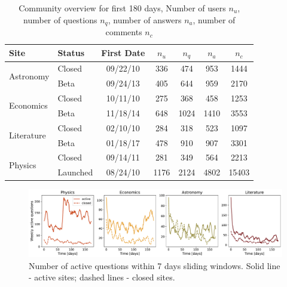 \begin{table}[h]
	\centering
	\caption[Community overview for first 180 days.]{Community overview for first 180 days, Number of users $n_u$, number of questions $n_q$, number of answers $n_a$, number of comments $n_c$}
	\label{tab:site-info}
	\begin{tabular}{llccccc}
		\toprule
		Site                 & Status                           & First Date                     & $n_u$                    & $n_q$                & $n_a$                  & $n_c$ \\ \hline
		\multirow{2}{*}{Astronomy}  & \multicolumn{1}{l|}{Closed}      & \multicolumn{1}{c|}{09/22/10} & \multicolumn{1}{c|}{336}  & \multicolumn{1}{c|}{474}  & \multicolumn{1}{c|}{953}  & 1444     \\
		& \multicolumn{1}{l|}{Beta} & \multicolumn{1}{c|}{09/24/13} & \multicolumn{1}{c|}{405}  & \multicolumn{1}{c|}{644}  & \multicolumn{1}{c|}{959}  & 2170     \\ \hline
		\multirow{2}{*}{Economics}  & \multicolumn{1}{l|}{Closed}      & \multicolumn{1}{c|}{10/11/10} & \multicolumn{1}{c|}{275}  & \multicolumn{1}{c|}{368}  & \multicolumn{1}{c|}{458}  & 1253     \\
		& \multicolumn{1}{l|}{Beta} & \multicolumn{1}{c|}{11/18/14} & \multicolumn{1}{c|}{648}  & \multicolumn{1}{c|}{1024} & \multicolumn{1}{c|}{1410} & 3553     \\ \hline
		\multirow{2}{*}{Literature} & \multicolumn{1}{l|}{Closed}      & \multicolumn{1}{c|}{02/10/10} & \multicolumn{1}{c|}{284}  & \multicolumn{1}{c|}{318}  & \multicolumn{1}{c|}{523}  & 1097     \\
		& \multicolumn{1}{l|}{Beta} & \multicolumn{1}{c|}{01/18/17} & \multicolumn{1}{c|}{478}  & \multicolumn{1}{c|}{910}  & \multicolumn{1}{c|}{907}  & 3301     \\ \hline
		\multirow{2}{*}{Physics}    & \multicolumn{1}{l|}{Closed}      & \multicolumn{1}{c|}{09/14/11} & \multicolumn{1}{c|}{281}  & \multicolumn{1}{c|}{349}  & \multicolumn{1}{c|}{564}  & 2213     \\
		& \multicolumn{1}{l|}{Launched}    & \multicolumn{1}{c|}{08/24/10} & \multicolumn{1}{c|}{1176} & \multicolumn{1}{c|}{2124} & \multicolumn{1}{c|}{4802} & 15403    \\
		\bottomrule
	\end{tabular}
\end{table}


\begin{figure}
	\centering
	\includegraphics[width=\linewidth]{figures/stackexchange/active_questions.pdf}
	\caption[Number of active questions within 7 days sliding windows]{Number of active questions within 7 days sliding windows. Solid line - active sites; dashed lines - closed sites.}
	\label{fig:active_questions}
\end{figure}

